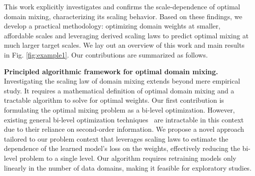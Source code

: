 \documentclass{article} %
\newcommand*\circled[1]{\tikz[baseline=(char.base)]{
            \node[shape=circle,draw,inner sep=2pt] (char) {#1};}}
\newcommand{\rrm}[1]{\textbf{\textcolor{red!50}{[Rafid: #1]}}}
\begin{document}
    





This work explicitly investigates and confirms the scale-dependence of optimal domain mixing, characterizing its scaling behavior. Based on these findings, we develop a practical methodology: optimizing domain weights at smaller, affordable scales and leveraging derived scaling laws to predict optimal mixing at much larger target scales. We lay out an overview of this work and main results in Fig. \ref{fig:example1}. Our contributions are summarized as follows.

\small{\circled{1}}\normalsize \textbf{ Principled algorithmic framework for optimal domain mixing.} Investigating the scaling law of domain mixing extends beyond mere empirical study. It requires a mathematical definition of optimal domain mixing and a tractable algorithm to solve for optimal weights. Our first contribution is formulating the optimal mixing problem as a bi-level optimization. However, existing general bi-level optimization techniques~\citep{colson2007overview,zhang2024introduction} are intractable in this context due to their reliance on second-order information. We propose a novel approach tailored to our problem context that leverages scaling laws to estimate the dependence of the learned model's loss on the weights, effectively reducing the bi-level problem to a single level. Our algorithm requires retraining models only linearly in the number of data domains, making it feasible for exploratory studies.
\end{document}
